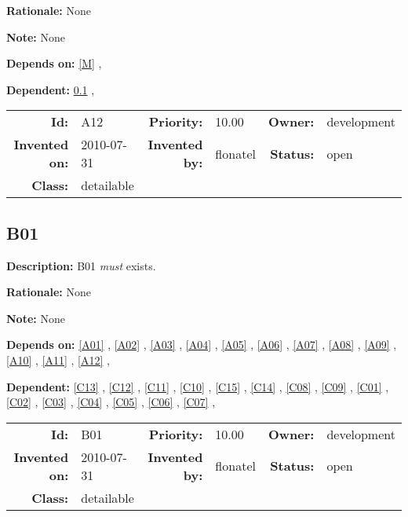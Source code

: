 \textbf{Rationale:} None

\textbf{Note:} None

\textbf{Depends on:} \ref{M} , 

\textbf{Dependent:} \ref{B01} , 

\par
{\small \begin{center}\begin{tabular}{rlrlrl}
\textbf{Id:} & A12 & \textbf{Priority:} & 10.00 & \textbf{Owner:} & development \\ 
\textbf{Invented on:} & 2010-07-31 & \textbf{Invented by:} & flonatel & \textbf{Status:} & open \\ 
\textbf{Class:} & detailable & & & & \\ 
\end{tabular}\end{center} }%
\subsection{B01}\label{B01}
\textbf{Description:} B01 \textsl{must} exists.

\textbf{Rationale:} None

\textbf{Note:} None

\textbf{Depends on:} \ref{A01} , \ref{A02} , \ref{A03} , \ref{A04} , \ref{A05} , \ref{A06} , \ref{A07} , \ref{A08} , \ref{A09} , \ref{A10} , \ref{A11} , \ref{A12} , 

\textbf{Dependent:} \ref{C13} , \ref{C12} , \ref{C11} , \ref{C10} , \ref{C15} , \ref{C14} , \ref{C08} , \ref{C09} , \ref{C01} , \ref{C02} , \ref{C03} , \ref{C04} , \ref{C05} , \ref{C06} , \ref{C07} , 

\par
{\small \begin{center}\begin{tabular}{rlrlrl}
\textbf{Id:} & B01 & \textbf{Priority:} & 10.00 & \textbf{Owner:} & development \\ 
\textbf{Invented on:} & 2010-07-31 & \textbf{Invented by:} & flonatel & \textbf{Status:} & open \\ 
\textbf{Class:} & detailable & & & & \\ 
\end{tabular}\end{center} }%

